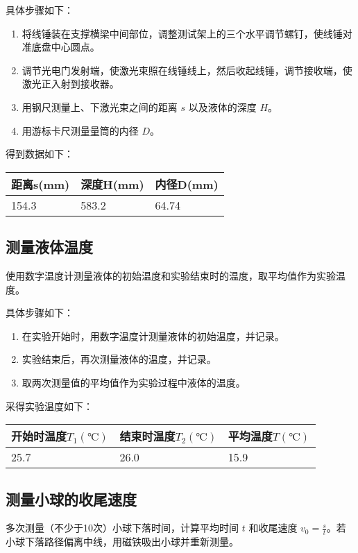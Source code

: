 \documentclass[UTF8]{ctexart}
\begin{document}
具体步骤如下：
\begin{enumerate}
    \item 将线锤装在支撑横梁中间部位，调整测试架上的三个水平调节螺钉，使线锤对准底盘中心圆点。
    \item 调节光电门发射端，使激光束照在线锤线上，然后收起线锤，调节接收端，使激光正入射到接收器。
    \item 用钢尺测量上、下激光束之间的距离 \(s\) 以及液体的深度 \(H\)。
    \item 用游标卡尺测量量筒的内径 \(D\)。
\end{enumerate}
得到数据如下：
\begin{table}[H]
    \centering
    \begin{tabular}{lll}
    \toprule
    距离s(mm)&深度H(mm)&内径D(mm)\\
    \midrule
    154.3&583.2&64.74\\
    \bottomrule
    \end{tabular}
\end{table}

\subsection{测量液体温度}
使用数字温度计测量液体的初始温度和实验结束时的温度，取平均值作为实验温度。

具体步骤如下：
\begin{enumerate}
    \item 在实验开始时，用数字温度计测量液体的初始温度，并记录。
    \item 实验结束后，再次测量液体的温度，并记录。
    \item 取两次测量值的平均值作为实验过程中液体的温度。
\end{enumerate}
采得实验温度如下：
\begin{table}[H]
    \centering
    \begin{tabular}{lll}
    \toprule
    开始时温度$T_1(℃)$&结束时温度$T_2(℃)$&平均温度$T(℃)$\\
    \midrule
    25.7&26.0&15.9\\
    \bottomrule
    \end{tabular}
\end{table}

\subsection{测量小球的收尾速度}
多次测量（不少于10次）小球下落时间，计算平均时间 \(t\) 和收尾速度 \(v_0 = \frac{s}{t}\)。若小球下落路径偏离中线，用磁铁吸出小球并重新测量。
\end{document}

